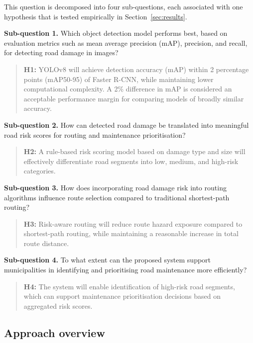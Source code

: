 \documentclass[10pt,a4paper,twocolumn]{article}
\begin{document}
This question is decomposed into four sub-questions, each associated
with one hypothesis that is tested empirically in
Section~\ref{sec:results}.

\textbf{Sub-question 1.} Which object detection model performs best,
based on evaluation metrics such as mean average precision (mAP),
precision, and recall, for detecting road damage in images?

\begin{quote}
\textbf{H1:} YOLOv8 will achieve detection accuracy (mAP) within 2 percentage points (mAP50-95) of
Faster R-CNN, while maintaining lower computational complexity. A 2\%
difference in mAP is considered an acceptable performance margin for
comparing models of broadly similar accuracy.
\end{quote}

\textbf{Sub-question 2.} How can detected road damage be translated into
meaningful road risk scores for routing and maintenance prioritisation?

\begin{quote}
\textbf{H2:} A rule-based risk scoring model based on damage type and
size will effectively differentiate road segments into low, medium, and
high-risk categories.
\end{quote}

\textbf{Sub-question 3.} How does incorporating road damage risk into
routing algorithms influence route selection compared to traditional
shortest-path routing?

\begin{quote}
\textbf{H3:} Risk-aware routing will reduce route hazard exposure
compared to shortest-path routing, while maintaining a reasonable
increase in total route distance.
\end{quote}

\textbf{Sub-question 4.} To what extent can the proposed system support
municipalities in identifying and prioritising road maintenance more
efficiently?

\begin{quote}
\textbf{H4:} The system will enable identification of high-risk road
segments, which can support maintenance prioritisation decisions based on
aggregated risk scores.
\end{quote}

\subsection{Approach overview}
\label{sec:approach-overview}
\end{document}

